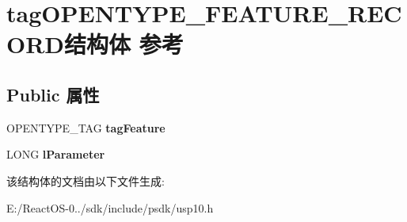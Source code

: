 \hypertarget{structtag_o_p_e_n_t_y_p_e___f_e_a_t_u_r_e___r_e_c_o_r_d}{}\section{tag\+O\+P\+E\+N\+T\+Y\+P\+E\+\_\+\+F\+E\+A\+T\+U\+R\+E\+\_\+\+R\+E\+C\+O\+R\+D结构体 参考}
\label{structtag_o_p_e_n_t_y_p_e___f_e_a_t_u_r_e___r_e_c_o_r_d}
\subsection*{Public 属性}
\begin{DoxyCompactItemize}
\item 
\mbox{\label{structtag_o_p_e_n_t_y_p_e___f_e_a_t_u_r_e___r_e_c_o_r_d_a36c9f75beaf5b8812c11473cf298289d}} 
O\+P\+E\+N\+T\+Y\+P\+E\+\_\+\+T\+AG {\bfseries tag\+Feature}
\item 
\mbox{\label{structtag_o_p_e_n_t_y_p_e___f_e_a_t_u_r_e___r_e_c_o_r_d_a5fa06ff7a3a11da52a9039e17cc3407f}} 
L\+O\+NG {\bfseries l\+Parameter}
\end{DoxyCompactItemize}


该结构体的文档由以下文件生成\+:\begin{DoxyCompactItemize}
\item 
E\+:/\+React\+O\+S-\/0../sdk/include/psdk/usp10.\+h\end{DoxyCompactItemize}
